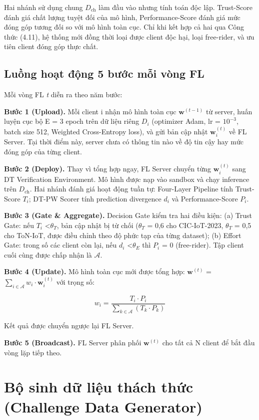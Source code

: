 Hai nhánh sử dụng chung $D_{\text{ch}}$ làm đầu vào nhưng tính toán độc lập. Trust-Score đánh giá chất lượng tuyệt đối của mô hình, Performance-Score đánh giá mức đóng góp tương đối so với mô hình toàn cục. Chỉ khi kết hợp cả hai qua Công thức (4.11), hệ thống mới đồng thời loại được client độc hại, loại free-rider, và ưu tiên client đóng góp thực chất.

\subsection{Luồng hoạt động 5 bước mỗi vòng FL}
Mỗi vòng FL \emph{t} diễn ra theo năm bước:

\textbf{Bước 1 (Upload).} Mỗi client i nhận mô hình toàn cục $\mathbf{w}^{(t-1)}$ từ server, huấn luyện cục bộ E = 3 epoch trên dữ liệu riêng $D_{i}$ (optimizer Adam, lr = $10^{-3}$, batch size 512, Weighted Cross-Entropy loss), và gửi bản cập nhật $\mathbf{w}_{i}^{(t)}$ về FL Server. Tại thời điểm này, server chưa có thông tin nào về độ tin cậy hay mức đóng góp của từng client.

\textbf{Bước 2 (Deploy).} Thay vì tổng hợp ngay, FL Server chuyển từng $\mathbf{w}_{i}^{(t)}$ sang DT Verification Environment. Mô hình được nạp vào sandbox và chạy inference trên $D_{\text{ch}}$. Hai nhánh đánh giá hoạt động tuần tự: Four-Layer Pipeline tính Trust-Score $T_{i}$; DT-PW Scorer tính prediction divergence $d_{i}$ và Performance-Score $P_{i}$.

\textbf{Bước 3 (Gate \& Aggregate).} Decision Gate kiểm tra hai điều kiện: (a) Trust Gate: nếu $T_{i}$ \textless $\theta_{T}$, bản cập nhật bị từ chối ($\theta_{T}$ = 0,6 cho CIC-IoT-2023, $\theta_{T}$ = 0,5 cho ToN-IoT, được điều chỉnh theo độ phức tạp của từng dataset); (b) Effort Gate: trong số các client còn lại, nếu $d_{i}$ \textless $\theta_{E}$ thì $P_{i}$ = 0 (free-rider). Tập client cuối cùng được chấp nhận là $\mathcal{A}$.

\textbf{Bước 4 (Update).} Mô hình toàn cục mới được tổng hợp: $\mathbf{w}^{(t)}$ = $\sum_{i \in \mathcal{A}} w_{i} \cdot \mathbf{w}_{i}^{(t)}$ với trọng số:

\[w_{i} = \frac{T_{i} \cdot P_{i}}{\sum_{k \in \mathcal{A}}^{}(T_{k} \cdot P_{k})}\]

Kết quả được chuyển ngược lại FL Server.

\textbf{Bước 5 (Broadcast).} FL Server phân phối $\mathbf{w}^{(t)}$ cho tất cả N client để bắt đầu vòng lặp tiếp theo.

\section{Bộ sinh dữ liệu thách thức (Challenge Data Generator)}

